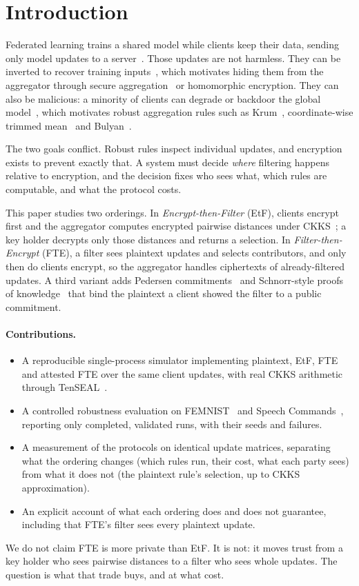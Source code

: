 \section{Introduction}

Federated learning trains a shared model while clients keep their data, sending only model updates to a server~\cite{mcmahan2017fedavg}. Those updates are not harmless. They can be inverted to recover training inputs~\cite{zhu2019dlg,geiping2020inverting}, which motivates hiding them from the aggregator through secure aggregation~\cite{bonawitz2017secagg} or homomorphic encryption. They can also be malicious: a minority of clients can degrade or backdoor the global model~\cite{fang2020local,baruch2019alie,xie2020dba}, which motivates robust aggregation rules such as Krum~\cite{blanchard2017krum}, coordinate-wise trimmed mean~\cite{yin2018trimmed} and Bulyan~\cite{elmhamdi2018bulyan}.

The two goals conflict. Robust rules inspect individual updates, and encryption exists to prevent exactly that. A system must decide \emph{where} filtering happens relative to encryption, and the decision fixes who sees what, which rules are computable, and what the protocol costs.

This paper studies two orderings. In \emph{Encrypt-then-Filter} (EtF), clients encrypt first and the aggregator computes encrypted pairwise distances under CKKS~\cite{cheon2017ckks}; a key holder decrypts only those distances and returns a selection. In \emph{Filter-then-Encrypt} (FTE), a filter sees plaintext updates and selects contributors, and only then do clients encrypt, so the aggregator handles ciphertexts of already-filtered updates. A third variant adds Pedersen commitments~\cite{pedersen1991commit} and Schnorr-style proofs of knowledge~\cite{schnorr1991signature} that bind the plaintext a client showed the filter to a public commitment.

\paragraph{Contributions.}
\begin{itemize}
\item A reproducible single-process simulator implementing plaintext, EtF, FTE and attested FTE over the same client updates, with real CKKS arithmetic through TenSEAL~\cite{benaissa2021tenseal}.
\item A controlled robustness evaluation on FEMNIST~\cite{caldas2018leaf} and Speech Commands~\cite{warden2018speech}, reporting only completed, validated runs, with their seeds and failures.
\item A measurement of the protocols on identical update matrices, separating what the ordering changes (which rules run, their cost, what each party sees) from what it does not (the plaintext rule's selection, up to CKKS approximation).
\item An explicit account of what each ordering does and does not guarantee, including that FTE's filter sees every plaintext update.
\end{itemize}

We do not claim FTE is more private than EtF. It is not: it moves trust from a key holder who sees pairwise distances to a filter who sees whole updates. The question is what that trade buys, and at what cost.
